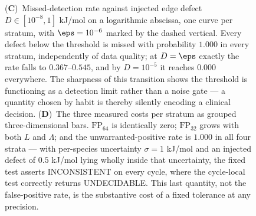 \begin{figure}[!htbp]
{    (\textbf{C})~Missed-detection rate against injected edge defect
    $D \in [10^{-8}, 1]$ kJ/mol on a logarithmic abscissa, one curve per
    stratum, with $\eps = 10^{-6}$ marked by the dashed vertical.
    Every defect below the threshold is missed with probability
    $1.000$ in every stratum, independently of data quality; at
    $D = \eps$ exactly the rate falls to $0.367$--$0.545$, and by
    $D = 10^{-5}$ it reaches $0.000$ everywhere.
    The sharpness of this transition shows the threshold is functioning
    as a detection limit rather than a noise gate --- a quantity chosen
    by habit is thereby silently encoding a clinical decision.
    (\textbf{D})~The three measured costs per stratum as grouped
    three-dimensional bars.
    $\mathrm{FP}_{64}$ is identically zero; $\mathrm{FP}_{32}$ grows
    with both $L$ and $\Lambda$; and the unwarranted-positive rate is
    $1.000$ in all four strata --- with per-species uncertainty
    $\sigma = 1$ kJ/mol and an injected defect of $0.5$ kJ/mol lying
    wholly inside that uncertainty, the fixed test asserts
    \textsf{INCONSISTENT} on every cycle, where the cycle-local test
    correctly returns \textsf{UNDECIDABLE}.
    This last quantity, not the false-positive rate, is the substantive
    cost of a fixed tolerance at any precision.}
    \label{fig:tol_panel2}
\end{figure}

